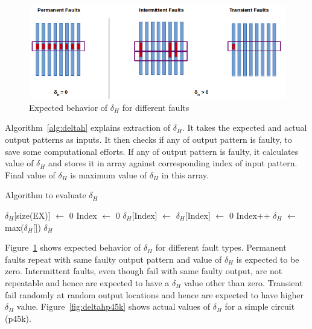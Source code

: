 \begin{figure}[h]
  \begin{center}
    \captionsetup{justification=centering}
    \includegraphics[scale=0.65]{figures/deltah.png}
    \caption{Expected behavior of $\delta_H$ for different faults}
    \label{fig:deltah}
  \end{center}
\end{figure}

Algorithm~\ref{alg:deltah} explains extraction of $\delta_H$. It takes the expected and actual output patterns as inputs. It then checks if any of output pattern is faulty, to save some computational efforts. If  any of output pattern is faulty, it calculates value of $\delta_H$ and stores it in array against corresponding index of input pattern. Final value of $\delta_H$ is maximum value of $\delta_H$ in this array. 

\begin{algorithm}[H]
  \caption{Algorithm to evaluate $\delta_H$}
  \label{alg:deltah}
  \begin{algorithmic}
 \State $\delta_H$[size(EX)] $\leftarrow$ 0\;
 \State Index $\leftarrow$ 0\;
   \State $\delta_H$[Index] $\leftarrow$ \;
  \Else
   \State $\delta_H$[Index] $\leftarrow$ 0\;
  \EndIf
  \State Index++\;
 \EndWhile
 \State$\delta_H$ $\leftarrow$ max($\delta_H$[])\;
 \State \Return $\delta_H$\;
 \EndProcedure
 \end{algorithmic}
\end{algorithm}

Figure~\ref{fig:deltah} shows expected behavior of $\delta_H$ for different fault types. Permanent faults repeat with same faulty output pattern and value of $\delta_H$ is expected to be zero. Intermittent faults, even though fail with same faulty output, are not repeatable and hence are expected to have a $\delta_H$ value other than zero. Transient fail randomly at random output locations and hence are expected to have higher $\delta_H$ value. Figure~\ref{fig:deltahp45k} shows actual values of $\delta_H$ for a simple circuit (p45k).

